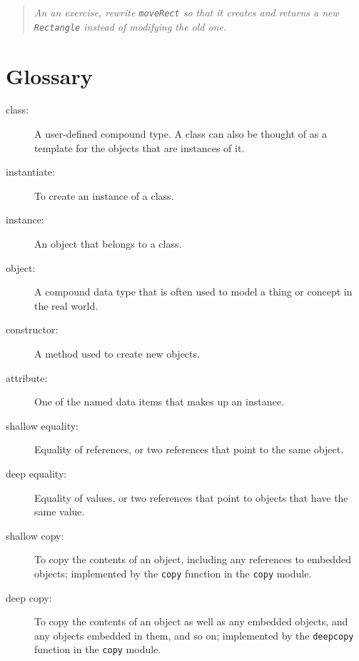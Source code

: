 \begin{quote}
{\em An an exercise, rewrite {\tt moveRect} so that it creates and
returns a new {\tt Rectangle} instead of modifying the old one.}
\end{quote}


\pagebreak

\section{Glossary}

\begin{description}

\item[class:] A user-defined compound type.
A class can also be thought of
as a template for the objects that are instances of it.

\item[instantiate:] To create an instance of a class.

\item[instance:] An object that belongs to a class.

\item[object:] A compound data type that is often used to
model a thing or concept in the real world.

\item[constructor:] A method used to create new objects.

\item[attribute:] One of the named data items that makes up
an instance.

\item[shallow equality:]  Equality of references, or two
references that point to the same object.

\item[deep equality:]  Equality of values, or two references
that point to objects that have the same value.

\item[shallow copy:] To copy the contents of an object, including
any references to embedded objects; implemented by the {\tt copy}
function in the {\tt copy} module.

\item[deep copy:] To copy the contents of an object as well as any
embedded objects, and any objects embedded in them, and so on;
implemented by the {\tt deepcopy} function in the {\tt copy} module.


\end{description}
